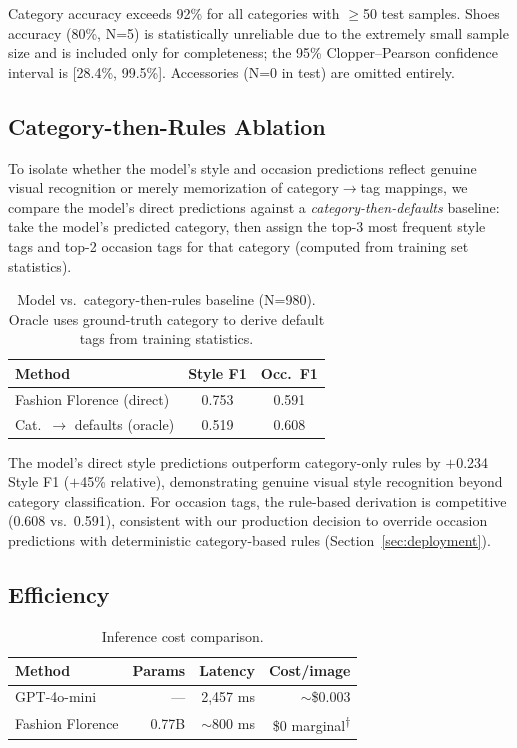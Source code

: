 \documentclass[10pt,twocolumn]{article}
\begin{document}
Category accuracy exceeds 92\% for all categories with $\geq$50 test
samples.  Shoes accuracy (80\%, N=5) is statistically unreliable due to
the extremely small sample size and is included only for completeness;
the 95\% Clopper--Pearson confidence interval is [28.4\%, 99.5\%].
Accessories (N=0 in test) are omitted entirely.

\subsection{Category-then-Rules Ablation}
\label{sec:cat_rules}

To isolate whether the model's style and occasion predictions reflect
genuine visual recognition or merely memorization of category$\to$tag
mappings, we compare the model's direct predictions against a
\emph{category-then-defaults} baseline: take the model's predicted
category, then assign the top-3 most frequent style tags and top-2 occasion
tags for that category (computed from training set statistics).

\begin{table}[t]
\centering
\small
\caption{Model vs.\ category-then-rules baseline (N=980).
Oracle uses ground-truth category to derive default tags
from training statistics.}
\label{tab:cat_rules}
\setlength{\tabcolsep}{4pt}
\begin{tabular}{@{}lcc@{}}
\toprule
Method & Style F1 & Occ.\ F1 \\
\midrule
Fashion Florence (direct) & 0.753 & 0.591 \\
Cat.\ $\to$ defaults (oracle) & 0.519 & 0.608 \\
\bottomrule
\end{tabular}
\end{table}

The model's direct style predictions outperform category-only rules by
$+$0.234 Style F1 ($+$45\% relative), demonstrating genuine visual style
recognition beyond category classification.  For occasion tags, the
rule-based derivation is competitive (0.608 vs.\ 0.591), consistent with
our production decision to override occasion predictions with deterministic
category-based rules (Section~\ref{sec:deployment}).

\subsection{Efficiency}

\begin{table}[t]
\centering
\caption{Inference cost comparison.}
\label{tab:efficiency}
\begin{tabular}{lrrr}
\toprule
Method & Params & Latency & Cost/image \\
\midrule
GPT-4o-mini & --- & 2,457 ms & $\sim$\$0.003 \\
Fashion Florence & 0.77B & $\sim$800 ms & \$0 marginal\textsuperscript{$\dagger$} \\
\bottomrule
\end{tabular}
\end{table}
\end{document}
